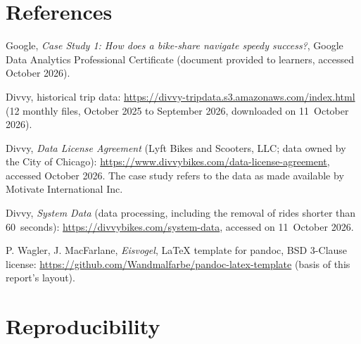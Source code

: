 \appendix
\section{References}
\label{sec:refs}

\begin{enumerate}[label={[\arabic*]}, leftmargin=2em]
  \item Google, \emph{Case Study 1: How does a bike-share navigate speedy success?}, Google Data Analytics Professional Certificate (document provided to learners, accessed October 2026).
  \item Divvy, historical trip data: \url{https://divvy-tripdata.s3.amazonaws.com/index.html} (12 monthly files, October 2025 to September 2026, downloaded on 11~October 2026).
  \item Divvy, \emph{Data License Agreement} (Lyft Bikes and Scooters, LLC; data owned by the City of Chicago): \url{https://www.divvybikes.com/data-license-agreement}, accessed October 2026. The case study refers to the data as made available by Motivate International Inc.
  \item Divvy, \emph{System Data} (data processing, including the removal of rides shorter than 60~seconds): \url{https://divvybikes.com/system-data}, accessed on 11~October 2026.
  \item P. Wagler, J. MacFarlane, \emph{Eisvogel}, LaTeX template for pandoc, BSD 3-Clause license: \url{https://github.com/Wandmalfarbe/pandoc-latex-template} (basis of this report's layout).
\end{enumerate}

\section{Reproducibility}
\label{sec:repro}

